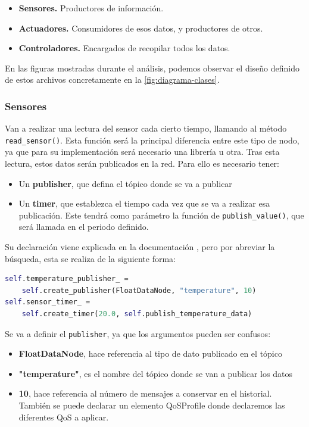 \begin{itemize}
    \item \textbf{Sensores.} Productores de información.
    \item \textbf{Actuadores.} Consumidores de esos datos, y productores de otros.
    \item \textbf{Controladores.} Encargados de recopilar todos los datos.
\end{itemize}

En las figuras mostradas durante el análisis, podemos observar el diseño definido de estos archivos concretamente en la \ref{fig:diagrama-clases}.

\subsubsection{Sensores}

Van a realizar una lectura del sensor cada cierto tiempo, llamando al método \verb|read_sensor()|. Esta función será la principal diferencia entre este tipo de nodo, ya que para su implementación será necesario una librería u otra. Tras esta lectura, estos datos serán publicados en la red. Para ello es necesario tener:

\begin{itemize}
    \item Un \textbf{publisher}, que defina el tópico donde se va a publicar
    \item Un \textbf{timer}, que establezca el tiempo cada vez que se va a realizar esa publicación. Este tendrá como parámetro la función de \verb|publish_value()|, que será llamada en el periodo definido.
\end{itemize}

Su declaración viene explicada en la documentación \cite{ros2}, pero por abreviar la búsqueda, esta se realiza de la siguiente forma:

\begin{lstlisting}[language=Python, caption=Publisher del sensor de temperatura]
self.temperature_publisher_ = 
    self.create_publisher(FloatDataNode, "temperature", 10)
self.sensor_timer_ = 
    self.create_timer(20.0, self.publish_temperature_data)
\end{lstlisting}

Se va a definir el \verb|publisher|, ya que los argumentos pueden ser confusos:

\begin{itemize}
    \item \textbf{FloatDataNode}, hace referencia al tipo de dato publicado en el tópico
    \item \textbf{"temperature"}, es el nombre del tópico donde se van a publicar los datos
    \item \textbf{10}, hace referencia al número de mensajes a conservar en el historial. También se puede declarar un elemento QoSProfile donde declaremos las diferentes QoS \cite{qos-ros} a aplicar.
\end{itemize}

